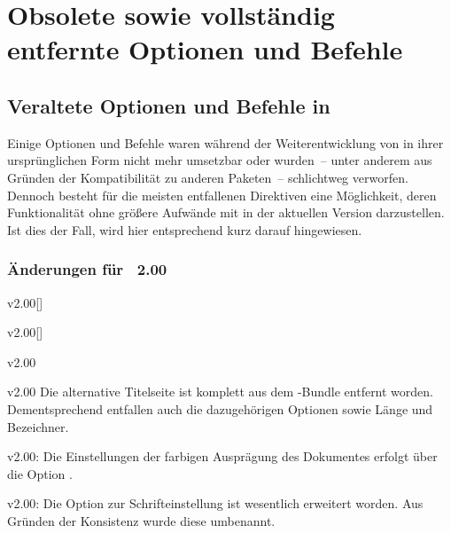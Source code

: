 \chapter{Obsolete sowie vollständig entfernte Optionen und Befehle}
%
\section{Veraltete Optionen und Befehle in \TUDScript}
Einige Optionen und Befehle waren während der Weiterentwicklung von \TUDScript
in ihrer ursprünglichen Form nicht mehr umsetzbar oder wurden~-- unter anderem 
aus Gründen der Kompatibilität zu anderen Paketen~-- schlichtweg verworfen. 
Dennoch besteht für die meisten entfallenen Direktiven eine Möglichkeit, deren 
Funktionalität ohne größere Aufwände mit \TUDScript in der aktuellen Version 
\vTUDScript{} darzustellen. Ist dies der Fall, wird hier entsprechend kurz 
darauf hingewiesen.


%
\subsection{Änderungen für \TUDScript~2.00}
\begin{Obsolete}{v2.00}[]{}
\begin{Obsolete}{v2.00}[]{}
\begin{Obsolete}{v2.00}{}
\begin{Obsolete}{v2.00}{}
\printobsoletelist%
%
Die alternative Titelseite ist komplett aus dem \TUDScript-Bundle entfernt 
worden. Dementsprechend entfallen auch die dazugehörigen Optionen sowie Länge 
und Bezeichner.
\end{Obsolete}
\end{Obsolete}
\end{Obsolete}
\end{Obsolete}

\begin{Obsolete}{v2.00:}{}
\printobsoletelist%
%
Die Einstellungen der farbigen Ausprägung des Dokumentes erfolgt über die 
Option .
\end{Obsolete}

\begin{Obsolete}{v2.00:}{}
\printobsoletelist%
%
Die Option zur Schrifteinstellung ist wesentlich erweitert worden. Aus Gründen 
der Konsistenz wurde diese umbenannt.
\end{Obsolete}

